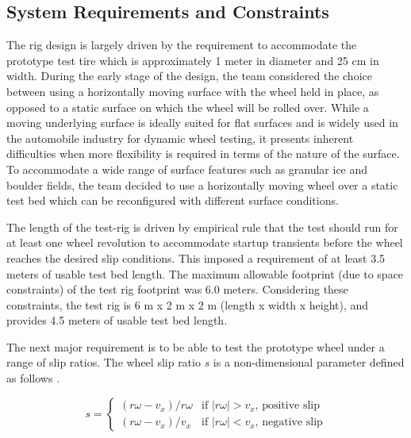 \documentclass{article}
\begin{document}
\subsection{System Requirements and Constraints}

The rig design is largely driven by the requirement to accommodate the prototype test tire which is approximately 1 meter in diameter and 25 cm in width.  During the early stage of the design, the team considered the choice between using a horizontally moving surface with the wheel held in place, as opposed to a static surface on which the wheel will be rolled over. While a moving underlying surface is ideally suited for flat surfaces and is widely used in the automobile industry for dynamic wheel testing, it presents inherent difficulties when more flexibility is required in terms of the nature of the surface.  To accommodate a wide range of surface features such as granular ice and boulder fields, the team decided to use a horizontally moving wheel over a static test bed which can be reconfigured with different surface conditions. 

The length of the test-rig is driven by empirical rule that the test should run for at least one wheel revolution to accommodate startup transients before the wheel reaches the desired slip conditions.  This imposed a requirement of at least 3.5 meters of usable test bed length. The maximum allowable footprint (due to space constraints) of the test rig footprint was 6.0 meters. Considering these constraints, the test rig is 6 m x 2 m x 2 m (length x width x height), and provides 4.5 meters of usable test bed length. 

The next major requirement is to be able to test the prototype wheel under a range of slip ratios. The wheel slip ratio $s$ is a non-dimensional parameter defined as follows \cite{ishigami2008terramechanics}.

\begin{equation}
        s =
        \left\{ \begin{array}{ll}
            (r\omega - v_x)/r\omega &  \text{if $|r\omega| > v_x$, positive slip} \\
             (r\omega - v_x)/v_x &  \text{if $|r\omega| < v_x$, negative slip} 
        \end{array} \right.
    \end{equation}
\end{document}
